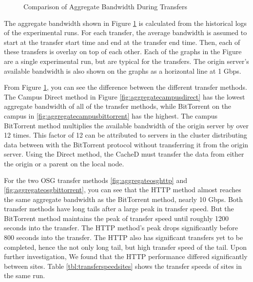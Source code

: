 \begin{figure}[h!t]
\caption{Comparison of Aggregate Bandwidth During Transfers}
\label{fig:aggregatebandwidthcached}
	
\end{figure}

The aggregate bandwidth shown in Figure \ref{fig:aggregatebandwidthcached} is calculated from the historical logs of the experimental runs.  For each transfer, the average bandwidth is assumed to start at the transfer start time and end at the transfer end time.  Then, each of these transfers is overlay on top of each other.  Each of the graphs in the Figure are a single experimental run, but are typical for the transfers.  The origin server's available bandwidth is also shown on the graphs as a horizontal line at 1 Gbps.

From Figure \ref{fig:aggregatebandwidthcached}, you can see the difference between the different transfer methods.  The Campus Direct method in Figure \ref{fig:aggregatecampusdirect} has the lowest aggregate bandwidth of all of the transfer methods, while BitTorrent on the campus in \ref{fig:aggregatecampusbittorrent} has the highest.  The campus BitTorrent method multiplies the available bandwidth of the origin server by over 12 times.  This factor of 12 can be attributed to servers in the cluster distributing data between with the BitTorrent protocol without transferring it from the origin server.  Using the Direct method, the CacheD must transfer the data from either the origin or a parent on the local node.

For the two OSG transfer methods \ref{fig:aggregateosghttp} and \ref{fig:aggregateosgbittorrent}, you can see that the HTTP method almost reaches the same aggregate bandwidth as the BitTorrent method, nearly 10 Gbps.  Both transfer methods have long tails after a large peak in transfer speed.  But the BitTorrent method maintains the peak of transfer speed until roughly 1200 seconds into the transfer.  The HTTP method's peak drops significantly before 800 seconds into the transfer.  The HTTP also has significant transfers yet to be completed, hence the not only long tail, but high transfer speed of the tail.  Upon further investigation, We found that the HTTP performance differed significantly between sites.  Table \ref{tbl:transferspeedsites} shows the transfer speeds of sites in the same run.

